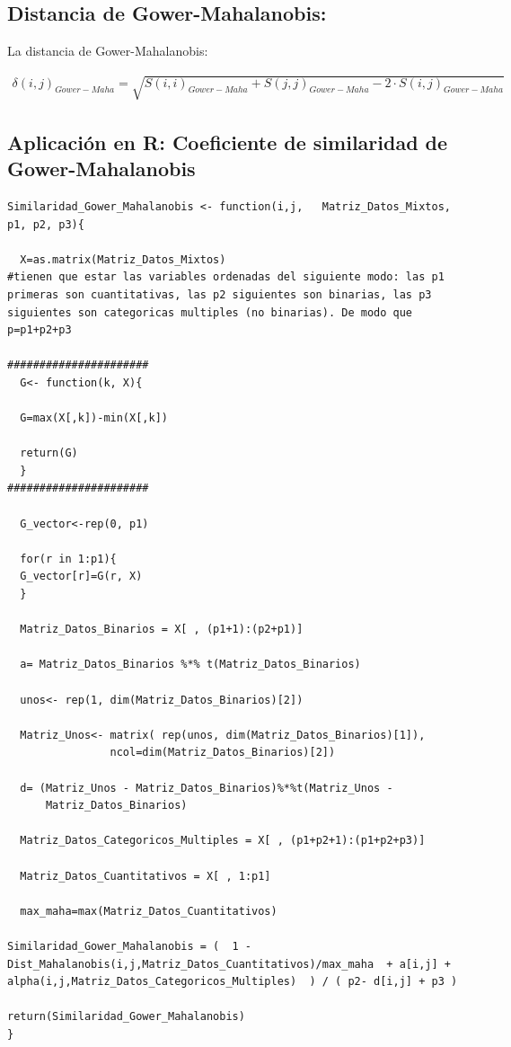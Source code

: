 \documentclass[12pt]{report} %
\begin{document}
\subsection{Distancia de Gower-Mahalanobis:}

\begin{tcolorbox}[toptitle=2mm,title=  Distancia de Gower-Mahalanobis:   ]

La distancia de Gower-Mahalanobis:

\begin{gather*}
\delta(i,j)_{Gower-Maha} = \sqrt{S(i,i)_{Gower-Maha} +S(j,j)_{Gower-Maha} - 2\cdot S(i,j)_{Gower-Maha} }
\end{gather*}

\end{tcolorbox}

\newpage

\subsection{Aplicación en R: Coeficiente de similaridad de Gower-Mahalanobis}

\begin{lstlisting}
Similaridad_Gower_Mahalanobis <- function(i,j,   Matriz_Datos_Mixtos, p1, p2, p3){

  X=as.matrix(Matriz_Datos_Mixtos) 
#tienen que estar las variables ordenadas del siguiente modo: las p1 primeras son cuantitativas, las p2 siguientes son binarias, las p3 siguientes son categoricas multiples (no binarias). De modo que p=p1+p2+p3
  
###################### 
  G<- function(k, X){

  G=max(X[,k])-min(X[,k])

  return(G)
  }
######################
  
  G_vector<-rep(0, p1)
  
  for(r in 1:p1){
  G_vector[r]=G(r, X)
  }
  
  Matriz_Datos_Binarios = X[ , (p1+1):(p2+p1)]
  
  a= Matriz_Datos_Binarios %*% t(Matriz_Datos_Binarios)
  
  unos<- rep(1, dim(Matriz_Datos_Binarios)[2])

  Matriz_Unos<- matrix( rep(unos, dim(Matriz_Datos_Binarios)[1]),      
                ncol=dim(Matriz_Datos_Binarios)[2])
                
  d= (Matriz_Unos - Matriz_Datos_Binarios)%*%t(Matriz_Unos -     
      Matriz_Datos_Binarios)   
  
  Matriz_Datos_Categoricos_Multiples = X[ , (p1+p2+1):(p1+p2+p3)]
  
  Matriz_Datos_Cuantitativos = X[ , 1:p1]
  
  max_maha=max(Matriz_Datos_Cuantitativos)
  
Similaridad_Gower_Mahalanobis = (  1 - Dist_Mahalanobis(i,j,Matriz_Datos_Cuantitativos)/max_maha  + a[i,j] + alpha(i,j,Matriz_Datos_Categoricos_Multiples)  ) / ( p2- d[i,j] + p3 )
  
return(Similaridad_Gower_Mahalanobis)
} 
\end{lstlisting}
\end{document}
